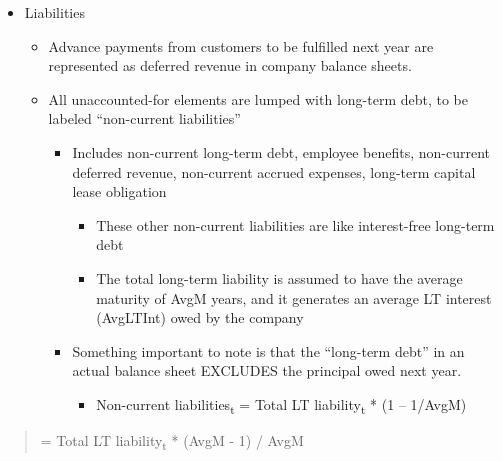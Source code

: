 \documentclass[12pt,a4paper]{article}
\begin{document}
\begin{itemize}
\begin{itemize}
    \begin{itemize}
    \item
      Total liquidity = cash equivalent + investments in market
      securities
    \end{itemize}
  \end{itemize}
\item
  Liabilities

  \begin{itemize}
  \item
    Advance payments from customers to be fulfilled next year are
    represented as deferred revenue in company balance sheets.
  \item
    All unaccounted-for elements are lumped with long-term debt, to be
    labeled ``non-current liabilities''

    \begin{itemize}
    \item
      Includes non-current long-term debt, employee benefits,
      non-current deferred revenue, non-current accrued expenses,
      long-term capital lease obligation

      \begin{itemize}
      \item
        These other non-current liabilities are like interest-free
        long-term debt
      \item
        The total long-term liability is assumed to have the average
        maturity of AvgM years, and it generates an average LT interest
        (AvgLTInt) owed by the company
      \end{itemize}
    \item
      Something important to note is that the ``long-term debt'' in an
      actual balance sheet EXCLUDES the principal owed next year.

      \begin{itemize}
      \item
        Non-current liabilities\textsubscript{t} = Total LT
        liability\textsubscript{t} * (1 -- 1/AvgM)
      \end{itemize}
    \end{itemize}
  \end{itemize}
\end{itemize}

\begin{quote}
= Total LT liability\textsubscript{t} * (AvgM - 1) / AvgM
\end{quote}
\end{document}
